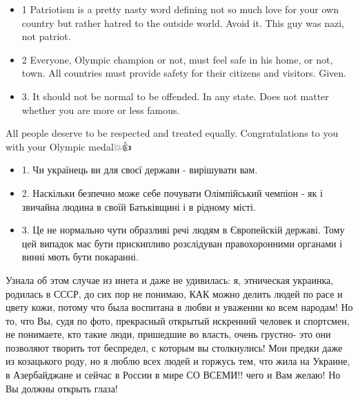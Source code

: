 \begin{itemize}
\begin{itemize}

\item 1 Patriotism is a pretty nasty word defining not so much love for your own
country but rather hatred to the outside world. Avoid it. This guy was nazi,
not patriot.

\item 2 Everyone, Olympic champion or not, must feel safe in his home, or not,
town. All countries must provide safety for their citizens and visitors.
Given.

\item 3. It should not be normal to be offended. In any state. Does not matter
whether you are more or less famous.

\end{itemize}

All people deserve to be respected and treated equally.
Congratulations to you with your Olympic medal💥👍

 
\begin{itemize}
  \item 1. Чи українець ви для своєї держави - вирішувати вам.
  \item 2. Наскільки безпечно може себе почувати Олімпійський чемпіон - як і звичайна людина в своїй Батьківщині і в рідному місті.
  \item 3. Це не нормально чути образливі речі людям в Європейскій державі. Тому цей випадок має бути прискипливо розслідуван правохоронними органами і винні мють бути покаранні.
\end{itemize}

 
Узнала об этом случае из инета и даже не удивилась: я, этническая украинка,
родилась в СССР, до сих пор не понимаю, КАК можно делить людей по расе и цвету
кожи, потому что была воспитана в любви и уважении ко всем народам! Но то, что
Вы, судя по фото, прекрасный открытый искренний человек и спортсмен, не
понимаете, кто такие люди, пришедшие во власть, очень грустно- это они
позволяют творить тот беспредел, с которым вы столкнулись! Мои предки даже из
козацького роду, но я люблю всех людей и горжусь тем, что жила на Украине, в
Азербайджане и сейчас в России в мире СО ВСЕМИ!! чего и Вам желаю! Но Вы должны
открыть глаза!


\end{itemize}
